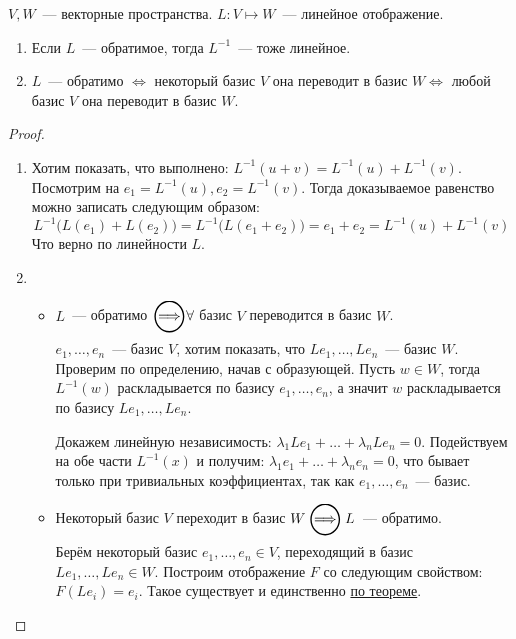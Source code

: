 \begin{statement}
    $V,W$~--- векторные пространства. $L: V\mapsto W$~--- линейное отображение.
    \begin{enumerate}
        \item Если $L$~--- обратимое, тогда $L^{-1}$~--- тоже линейное.
        \item $L$~--- обратимо $\Leftrightarrow$ некоторый базис $V$ она переводит в базис $W\Leftrightarrow$ 
            любой базис $V$ она переводит в базис $W$.
    \end{enumerate}
\end{statement}
\begin{proof}\leavevmode
    \begin{enumerate}
        \item 
            Хотим показать, что выполнено: $L^{-1}(u + v) = L^{-1}(u) + L^{-1}(v)$. Посмотрим на 
            $e_1 = L^{-1}(u), e_2 = L^{-1}(v)$. Тогда доказываемое равенство можно записать следующим
            образом: 
            $$L^{-1}\big(L(e_1) + L(e_2)\big) = L^{-1}\big(L(e_1 + e_2)\big) = e_1 + e_2 =
            L^{-1}(u) + L^{-1}(v)$$
            Что верно по линейности $L$.
        \item
            \begin{itemize}
                \item
                    $L$~--- обратимо $\ora \forall$ базис $V$ переводится в базис $W$.

                    $e_1,\dots,e_n$~--- базис $V$, хотим показать, что $Le_1,\dots,Le_n$~--- базис $W$.
                    Проверим по определению, начав с образующей. Пусть $w\in W$, тогда
                    $L^{-1}(w)$ раскладывается по базису $e_1,\dots, e_n$, а значит $w$
                    раскладывается по базису $Le_1,\dots, Le_n$. 

                    Докажем линейную независимость: $\lambda_1Le_1 + \dots + \lambda_nLe_n=0$.
                    Подействуем на обе части $L^{-1}(x)$ и получим: $\lambda_1e_1+\dots+\lambda_ne_n=0$, 
                    что бывает только при тривиальных коэффициентах, так как $e_1,\dots,e_n$~--- базис.
                \item
                    Некоторый базис $V$ переходит в базис $W\ora L$~--- обратимо.

                    Берём некоторый базис $e_1,\dots,e_n \in V$, переходящий в базис 
                    $Le_1,\dots,Le_n \in W$. Построим отображение $F$ со следующим свойством:
                    $F(Le_i)=e_i$. Такое существует и единственно \hyperref[thm:Линейное отображение однозначно задаётся двумя базисами]
                    {по теореме}.


\end{itemize}
\end{enumerate}
\end{proof}
